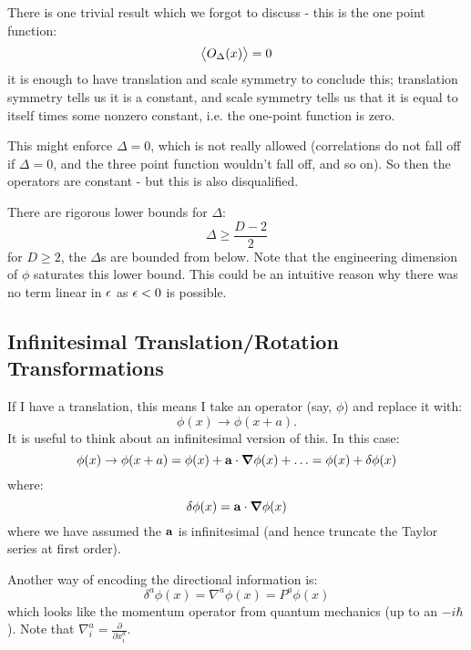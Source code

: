 There is one trivial result which we forgot to discuss - this is the one point function:
\begin{equation}
    \left< O_\Delta(x) \right> = 0
\end{equation}
it is enough to have translation and scale symmetry to conclude this; translation symmetry tells us it is a constant, and scale symmetry tells us that it is equal to itself times some nonzero constant, i.e. the one-point function is zero. 

This might enforce $\Delta = 0$, which is not really allowed (correlations do not fall off if $\Delta = 0$, and the three point function wouldn't fall off, and so on). So then the operators are constant - but this is also disqualified.

There are rigorous lower bounds for $\Delta$:
\begin{equation}
    \Delta \geq \frac{D - 2}{2}
\end{equation}
for $D \geq 2$, the $\Delta$s are bounded from below. Note that the engineering dimension of $\phi$ saturates this lower bound. This could be an intuitive reason why there was no term linear in $\epsilon$ as $\epsilon < 0$ is possible.

\subsection{Infinitesimal Translation/Rotation Transformations}
If I have a translation, this means I take an operator (say, $\phi$) and replace it with:
\begin{equation}
    \phi(x) \to \phi(x + a).
\end{equation}
It is useful to think about an infinitesimal version of this. In this case:
\begin{equation}
    \phi(x) \to \phi(x + a) = \phi(x) + \v{a} \cdot \nabla\phi(x) + \ldots = \phi(x) + \delta\phi(x)
\end{equation}
where:
\begin{equation}
    \delta\phi(x) = \v{a} \cdot \nabla \phi(x)
\end{equation}
where we have assumed the $\mathbf{a}$ is infinitesimal (and hence truncate the Taylor series at first order).

Another way of encoding the directional information is:
\begin{equation}
    \delta^a \phi(x) = \nabla^a \phi(x) = P^a\phi(x)
\end{equation}
which looks like the momentum operator from quantum mechanics (up to an $-i\hbar$). Note that $\nabla^a_i = \frac{\partial}{\partial x^a_i}$. 

